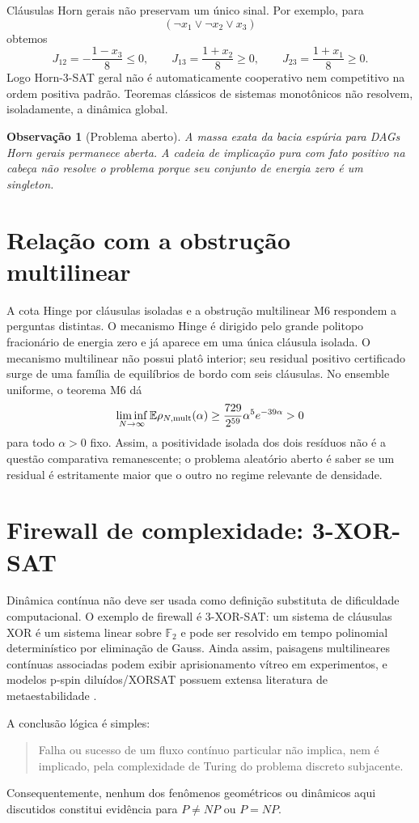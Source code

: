 \documentclass[11pt,a4paper]{article}
\newtheorem{remark}[theorem]{Observação}
\begin{document}
Cláusulas Horn gerais não preservam um único sinal. Por exemplo, para
\[
(\neg x_1\lor\neg x_2\lor x_3)
\]
obtemos
\[
J_{12}=-\frac{1-x_3}{8}\le0,\qquad J_{13}=\frac{1+x_2}{8}\ge0,\qquad J_{23}=\frac{1+x_1}{8}\ge0.
\]
Logo Horn-3-SAT geral não é automaticamente cooperativo nem competitivo na ordem positiva padrão. Teoremas clássicos de sistemas monotônicos não resolvem, isoladamente, a dinâmica global.

\begin{remark}[Problema aberto]
A massa exata da bacia espúria para DAGs Horn gerais permanece aberta. A cadeia de implicação pura com fato positivo na cabeça não resolve o problema porque seu conjunto de energia zero é um singleton.
\end{remark}

\section{Relação com a obstrução multilinear}
A cota Hinge por cláusulas isoladas e a obstrução multilinear M6 respondem a perguntas distintas. O mecanismo Hinge é dirigido pelo grande politopo fracionário de energia zero e já aparece em uma única cláusula isolada. O mecanismo multilinear não possui platô interior; seu residual positivo certificado surge de uma família de equilíbrios de bordo com seis cláusulas. No ensemble uniforme, o teorema M6 dá
\[
\liminf_{N\to\infty}\mathbb E\rho_{N,\rm mult}(\alpha)\ge\frac{729}{2^{59}}\alpha^5e^{-39\alpha}>0
\]
para todo $\alpha>0$ fixo. Assim, a positividade isolada dos dois resíduos não é a questão comparativa remanescente; o problema aleatório aberto é saber se um residual é estritamente maior que o outro no regime relevante de densidade.

\section{Firewall de complexidade: 3-XOR-SAT}
Dinâmica contínua não deve ser usada como definição substituta de dificuldade computacional. O exemplo de firewall é 3-XOR-SAT: um sistema de cláusulas XOR é um sistema linear sobre $\mathbb F_2$ e pode ser resolvido em tempo polinomial determinístico por eliminação de Gauss. Ainda assim, paisagens multilineares contínuas associadas podem exibir aprisionamento vítreo em experimentos, e modelos p-spin diluídos/XORSAT possuem extensa literatura de metaestabilidade \cite{Mezard,Ricci}.

A conclusão lógica é simples:
\begin{quote}
Falha ou sucesso de um fluxo contínuo particular não implica, nem é implicado, pela complexidade de Turing do problema discreto subjacente.
\end{quote}
Consequentemente, nenhum dos fenômenos geométricos ou dinâmicos aqui discutidos constitui evidência para $P\ne NP$ ou $P=NP$.
\end{document}
